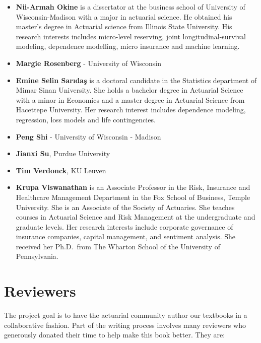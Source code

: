 \documentclass[]{book}
\providecommand{\tightlist}{%
  \setlength{\itemsep}{0pt}\setlength{\parskip}{0pt}}
\theoremstyle{definition}
\theoremstyle{definition}
\theoremstyle{definition}
\theoremstyle{remark}
\begin{document}
\begin{itemize}
\item
  \textbf{Nii-Armah Okine} is a dissertator at the business school of
  University of Wisconsin-Madison with a major in actuarial science. He
  obtained his master's degree in Actuarial science from Illinois State
  University. His research interests includes micro-level reserving,
  joint longitudinal-survival modeling, dependence modelling, micro
  insurance and machine learning.
\item
  \textbf{Margie Rosenberg} - University of Wisconsin
\end{itemize}

\begin{itemize}
\item
  \textbf{Emine Selin Sarıdaş} is a doctoral candidate in the Statistics
  department of Mimar Sinan University. She holds a bachelor degree in
  Actuarial Science with a minor in Economics and a master degree in
  Actuarial Science from Hacettepe University. Her research interest
  includes dependence modeling, regression, loss models and life
  contingencies.
\item
  \textbf{Peng Shi} - University of Wisconsin - Madison
\item
  \textbf{Jianxi Su}, Purdue University
\item
  \textbf{Tim Verdonck}, KU Leuven
\end{itemize}

\begin{itemize}
\tightlist
\item
  \textbf{Krupa Viswanathan} is an Associate Professor in the Risk,
  Insurance and Healthcare Management Department in the Fox School of
  Business, Temple University. She is an Associate of the Society of
  Actuaries. She teaches courses in Actuarial Science and Risk
  Management at the undergraduate and graduate levels. Her research
  interests include corporate governance of insurance companies, capital
  management, and sentiment analysis. She received her Ph.D.~from The
  Wharton School of the University of Pennsylvania.
\end{itemize}

\section*{Reviewers}\label{reviewers}

The project goal is to have the actuarial community author our textbooks
in a collaborative fashion. Part of the writing process involves many
reviewers who generously donated their time to help make this book
better. They are:
\end{document}

